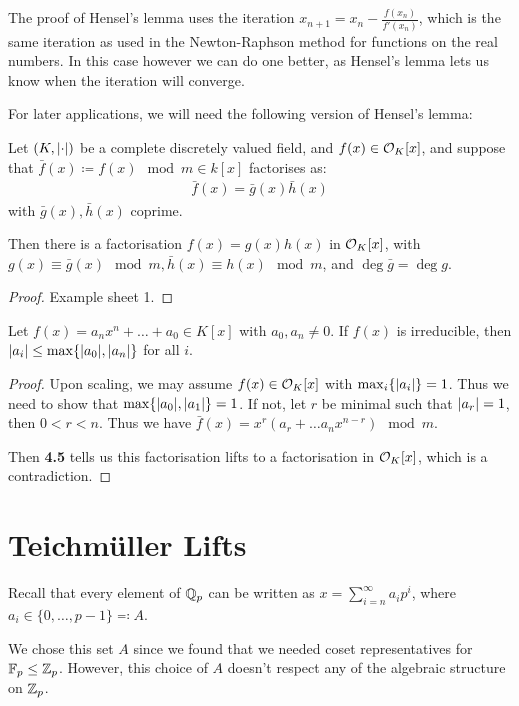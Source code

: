 \documentclass[10pt,a4paper]{article}
\begin{document}
The proof of Hensel's lemma uses the iteration $x_{n+1} = x_n - \frac{f(x_n)}{f'(x_n)}$, which is the same iteration as used in the Newton-Raphson method for functions on the real numbers. In this case however we can do one better, as Hensel's lemma lets us know when the iteration will converge.

For later applications, we will need the following version of Hensel's lemma:
\begin{theorem}
  Let $(K, \lvert\cdot\rvert)$ be a complete discretely valued field, and $f(x) \in \mathcal{O}_K[x]$, and suppose that $\bar{f}(x) \coloneqq f(x) \mod m \in k[x]$ factorises as:
  \begin{align*}
    \bar{f}(x) = \bar{g}(x)\bar{h}(x)
  \end{align*}
  with $\bar{g}(x), \bar{h}(x)$ coprime.

  Then there is a factorisation $f(x) = g(x)h(x)$ in $\mathcal{O}_K[x]$, with $g(x) \equiv \bar{g}(x)\mod m, \bar{h}(x) \equiv h(x) \mod m$, and $\deg \bar{g}= \deg g$.
\end{theorem}
\begin{proof}
  Example sheet 1.
\end{proof}
\begin{corollary}
  Let $f(x) = a_nx^n + \ldots + a_0 \in K[x]$ with $a_0, a_n \neq 0$. If $f(x)$ is irreducible, then $\lvert a_i\rvert\leq \max\{\lvert a_0\rvert, \lvert a_n\rvert\}$ for all $i$.
\end{corollary}
\begin{proof}
  Upon scaling, we may assume $f(x) \in \mathcal{O}_K[x]$ with $\max_i\{\lvert a_i\rvert\} = 1$. Thus we need to show that $\max\{\lvert a_0\rvert, \lvert a_1\rvert\} = 1$. If not, let $r$ be minimal such that $\lvert a_r\rvert=1$, then $0 < r < n$. Thus we have $\bar{f}(x) = x^r(a_r + \ldots a_nx^{n-r}) \mod m$.

  Then \textbf{4.5} tells us this factorisation lifts to a factorisation in $\mathcal{O}_K[x]$, which is a contradiction.
\end{proof}

\section{Teichm\"uller Lifts}
Recall that every element of $\mathbb{Q}_p$ can be written as $x = \sum_{i=n}^\infty a_i p^i$, where \mbox{$a_i \in \{0,\ldots,p-1\}\eqqcolon A$.}

We chose this set $A$ since we found that we needed coset representatives for $\mathbb{F}_p \leq \mathbb{Z}_p$. However, this choice of $A$ doesn't respect any of the algebraic structure on $\mathbb{Z}_p$.
\end{document}
